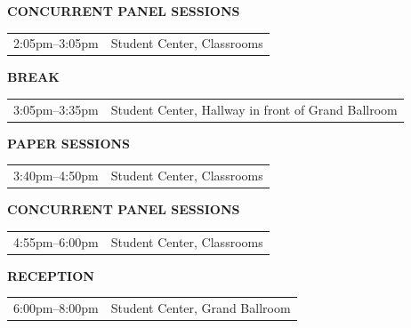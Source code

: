 \documentclass[
  10pt,
  letterpaper,
  DIV=11,
  numbers=noendperiod]{scrartcl}
\begin{document}
{\vspace{0.25em}

\noindent\textcolor{event}{\textbf{CONCURRENT PANEL SESSIONS}}

\begin{tabular}{@{}p{3.2cm}p{\dimexpr\linewidth-3.5cm}@{}}
  2:05pm--3:05pm & Student Center, Classrooms \\
\end{tabular}

\vspace{0.25em}

\noindent\textcolor{event}{\textbf{BREAK}}

\begin{tabular}{@{}p{3.2cm}p{\dimexpr\linewidth-3.5cm}@{}}
  3:05pm--3:35pm & Student Center, Hallway in front of Grand Ballroom \\
\end{tabular}

\vspace{0.25em}

\noindent\textcolor{event}{\textbf{PAPER SESSIONS}}

\begin{tabular}{@{}p{3.2cm}p{\dimexpr\linewidth-3.5cm}@{}}
  3:40pm--4:50pm & Student Center, Classrooms \\
\end{tabular}

\vspace{0.25em}

\noindent\textcolor{event}{\textbf{CONCURRENT PANEL SESSIONS}}

\begin{tabular}{@{}p{3.2cm}p{\dimexpr\linewidth-3.5cm}@{}}
  4:55pm--6:00pm & Student Center, Classrooms \\
\end{tabular}

\vspace{0.25em}

\noindent\textcolor{event}{\textbf{RECEPTION}}

\begin{tabular}{@{}p{3.2cm}p{\dimexpr\linewidth-3.5cm}@{}}
  6:00pm--8:00pm & Student Center, Grand Ballroom \\
\end{tabular}

\vspace{0.25em}

}
\newpage

\end{document}
